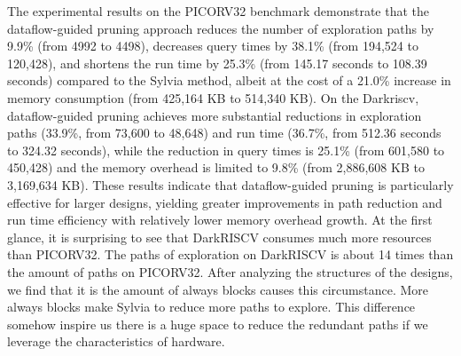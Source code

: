 \documentclass[conference]{IEEEtran}
\begin{document}
The experimental results on the PICORV32 benchmark demonstrate that the dataflow-guided pruning approach reduces the number of exploration paths by 9.9\% (from 4992 to 4498), decreases query times by 38.1\% (from 194,524 to 120,428), and shortens the run time by 25.3\% (from 145.17 seconds to 108.39 seconds) compared to the Sylvia method, albeit at the cost of a 21.0\% increase in memory consumption (from 425,164 KB to 514,340 KB). On the Darkriscv, dataflow-guided pruning achieves more substantial reductions in exploration paths (33.9\%, from 73,600 to 48,648) and run time (36.7\%, from 512.36 seconds to 324.32 seconds), while the reduction in query times is 25.1\% (from 601,580 to 450,428) and the memory overhead is limited to 9.8\% (from 2,886,608 KB to 3,169,634 KB). These results indicate that dataflow-guided pruning is particularly effective for larger designs, yielding greater improvements in path reduction and run time efficiency with relatively lower memory overhead growth.
At the first glance, it is surprising to see that DarkRISCV consumes much more resources than PICORV32. The paths of exploration on DarkRISCV is about 14 times than the amount of paths on PICORV32. After analyzing the structures of the designs, we find that it is the amount of always blocks causes this circumstance. More always blocks make Sylvia to reduce more paths to explore. This difference somehow inspire us there is a huge space to reduce the redundant paths if we leverage the characteristics of hardware. 
\end{document}
